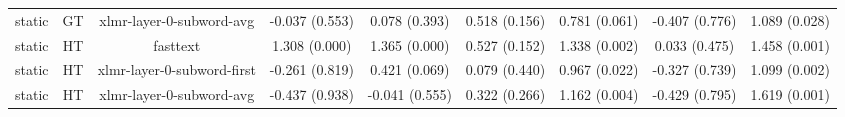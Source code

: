 \begin{sidewaystable}[htb]
\begin{tabular}{@{}ccccccccc@{}}
        static & GT & xlmr-layer-0-subword-avg & -0.037 (0.553) & 0.078 (0.393) & 0.518 (0.156) & 0.781 (0.061) & -0.407 (0.776) & 1.089 (0.028) \\
        static & HT & fasttext & 1.308 (0.000) & 1.365 (0.000) & 0.527 (0.152) & 1.338 (0.002) & 0.033 (0.475) & 1.458 (0.001) \\
        static & HT & xlmr-layer-0-subword-first & -0.261 (0.819) & 0.421 (0.069) & 0.079 (0.440) & 0.967 (0.022) & -0.327 (0.739) & 1.099 (0.002) \\
        static & HT & xlmr-layer-0-subword-avg & -0.437 (0.938) & -0.041 (0.555) & 0.322 (0.266) & 1.162 (0.004) & -0.429 (0.795) & 1.619 (0.001) \\
        \bottomrule
    \end{tabular}
\end{sidewaystable}